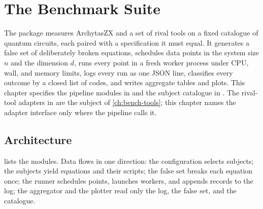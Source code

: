 \chapter{The Benchmark Suite}\label{ch:bench-pipeline}

The package  measures ArchytasZX and a set of rival tools on a fixed
catalogue of quantum circuits, each paired with a specification it must equal. It generates a
false set of deliberately broken equations, schedules data points in the system size $n$ and the
dimension $d$, runs every point in a fresh worker process under CPU, wall, and memory limits,
logs every run as one JSON line, classifies every outcome by a closed list of codes, and writes
aggregate tables and plots. This chapter specifies the pipeline modules in
 and the subject catalogue in . The rival-tool
adapters in  are the subject of \cref{ch:bench-tools}; this chapter
names the adapter interface only where the pipeline calls it.

\section{Architecture}\label{sec:bench-architecture}

 lists the modules. Data flows in one direction: the configuration
selects subjects; the subjects yield equations and their scripts; the false set breaks each
equation once; the runner schedules points, launches workers, and appends records to the log;
the aggregator and the plotter read only the log, the false set, and the catalogue.

